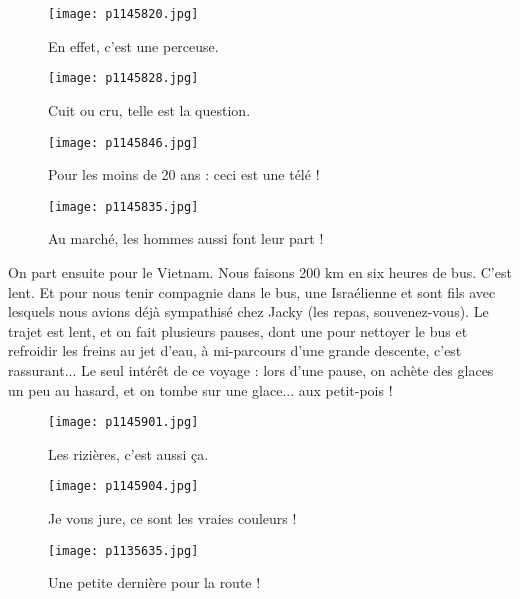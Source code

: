 \documentclass{book}
\begin{document}
\begin{figure}[h]
\centering
\texttt{[image: p1145820.jpg]}
\caption*{En effet, c'est une perceuse.}
\end{figure}


\begin{figure}[h]
\centering
\texttt{[image: p1145828.jpg]}
\caption*{Cuit ou cru, telle est la question.}
\end{figure}




\begin{figure}[h]
\centering
\texttt{[image: p1145846.jpg]}
\caption*{Pour les moins de 20 ans : ceci est une télé !}
\end{figure}


\begin{figure}[h]
\centering
\texttt{[image: p1145835.jpg]}
\caption*{Au marché, les hommes aussi font leur part !}
\end{figure}

On part ensuite pour le Vietnam. Nous faisons 200 km en six heures de bus. C'est lent. Et pour nous tenir compagnie dans le bus, une Israélienne et sont fils avec lesquels nous avions déjà sympathisé chez Jacky (les repas, souvenez-vous). Le trajet est lent, et on fait plusieurs pauses, dont une pour nettoyer le bus et refroidir les freins au jet d'eau, à mi-parcours d'une grande descente, c'est rassurant... Le seul intérêt de ce voyage : lors d'une pause, on achète des glaces un peu au hasard, et on tombe sur une glace... aux petit-pois !


\begin{figure}[h]
\centering
\texttt{[image: p1145901.jpg]}
\caption*{Les rizières, c'est aussi ça.}
\end{figure}

\begin{figure}[h]
\centering
\texttt{[image: p1145904.jpg]}
\caption*{Je vous jure, ce sont les vraies couleurs !}
\end{figure}

\begin{figure}[h]
\centering
\texttt{[image: p1135635.jpg]}
\caption*{Une petite dernière pour la route !}
\end{figure}



\tableofcontents
\end{document}
